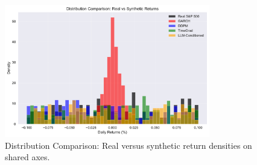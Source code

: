 \begin{figure}[htbp]
\centering
\includegraphics[width=0.8\textwidth]{figures/distribution_comparison.pdf}
\caption{Distribution Comparison: Real versus synthetic return densities on shared axes.}
\label{fig:distribution_comparison}
\end{figure}